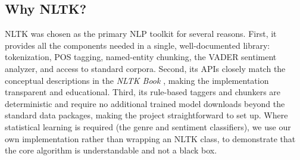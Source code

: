 \subsection{Why NLTK?}

NLTK \cite{bird2009natural} was chosen as the primary NLP toolkit for several reasons. First, it provides all the components needed in a single, well-documented library: tokenization, POS tagging, named-entity chunking, the VADER sentiment analyzer, and access to standard corpora. Second, its APIs closely match the conceptual descriptions in the \textit{NLTK Book} \cite{bird2009natural}, making the implementation transparent and educational. Third, its rule-based taggers and chunkers are deterministic and require no additional trained model downloads beyond the standard data packages, making the project straightforward to set up. Where statistical learning is required (the genre and sentiment classifiers), we use our own implementation rather than wrapping an NLTK class, to demonstrate that the core algorithm is understandable and not a black box.
